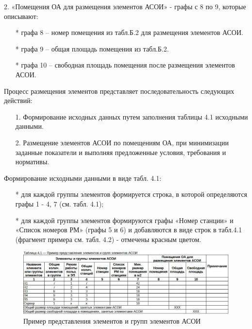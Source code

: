 \documentclass[12pt, a4paper, simple]{eskdtext}
\begin{document}
    2. «Помещения ОА для размещения элементов  АСОИ» - графы с 8 по 9, которые описывают:
        
    \begin{itemize}
        \item[*] графа 8 – номер помещения из табл.Б.2  для размещения элементов АСОИ. 
        \item[*] графа 9 – общая площадь помещения из табл.Б.2. 
        \item[*] графа 10 – свободная площадь помещения после размещения элементов АСОИ. 
    \end{itemize}

    Процесс размещения элементов представляет последовательность следующих действий:
    \begin{enumerate}
        \item[1.] Формирование исходных данных путем заполнения таблицы 4.1 исходными данными.
        \item[2.] Размещение элементов АСОИ по помещениям ОА, при минимизации заданные показатели
        и вы­полняя предложенные условия, требования и нормативы. 
    \end{enumerate}

    Формирование исходными данными в виде табл. 4.1:
    \begin{itemize}
        \item[*] для каждой группы элементов формируется строка, в которой определяются графы 1 - 4, 7 (см. табл. 4.1);
        \item[*] для каждой группы элементов формируются графы «Номер станции»
        и «Список номеров РМ» (графы 5 и 6) и добавляются в виде строк в табл.4.1
        (фрагмент примера см. табл. 4.2) - отме­чены красным цветом.
    \end{itemize}

    \begin{figure}[ht!]
        \centering
        \includegraphics[width=14cm]
            {_docs/Таблица4-1ПримерПредставленияЭлементовИГруппЭлементовАСОИ.jpg}
        \caption{Пример представления элементов и групп элементов АСОИ}
    \end{figure}
\end{document}
